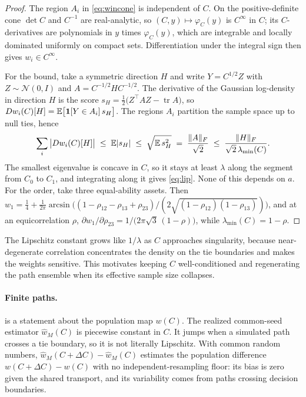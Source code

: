 \begin{proof}
The region $A_i$ in \eqref{eq:wincone} is independent of $C$. On the
positive-definite cone $\det C$ and $C^{-1}$ are real-analytic, so
$(C, y) \mapsto \varphi_C(y)$ is $C^\infty$ in $C$; its $C$-derivatives are
polynomials in $y$ times $\varphi_C(y)$, which are integrable and locally
dominated uniformly on compact sets. Differentiation under the integral sign
then gives $w_i \in C^\infty$.

For the bound, take a symmetric direction $H$ and write $Y = C^{1/2}Z$ with
$Z\sim\mathcal N(0,I)$ and $A = C^{-1/2}HC^{-1/2}$. The derivative of the
Gaussian log-density in direction $H$ is the score
$s_H = \tfrac12\big(Z^\top A Z - \operatorname{tr}A\big)$, so
$Dw_i(C)[H] = \mathbb{E}\big[\mathbf 1[Y\in A_i]\,s_H\big]$. The regions $A_i$ partition
the sample space up to null ties, hence
\[
  \sum_i \big|Dw_i(C)[H]\big| \;\le\; \mathbb{E}|s_H| \;\le\; \sqrt{\mathbb{E}\, s_H^2}
  \;=\; \frac{\|A\|_F}{\sqrt2} \;\le\; \frac{\|H\|_F}{\sqrt2\,\lambda_{\min}(C)} .
\]
The smallest eigenvalue is concave in $C$, so it stays at least $\lambda$ along
the segment from $C_0$ to $C_1$, and integrating along it gives \eqref{eq:lip}.
None of this depends on $a$. For the order, take three equal-ability assets. Then
$w_1 = \tfrac14 + \tfrac1{2\pi}\arcsin\!\big((1-\rho_{12}-\rho_{13}+\rho_{23})
/(2\sqrt{(1-\rho_{12})(1-\rho_{13})})\big)$, and at an equicorrelation $\rho$,
$\partial w_1/\partial\rho_{23} = 1/\big(2\pi\sqrt3\,(1-\rho)\big)$, while
$\lambda_{\min}(C) = 1-\rho$.
\end{proof}

The Lipschitz constant grows like $1/\lambda$ as $C$ approaches singularity,
because near-degenerate correlation concentrates the density on the tie
boundaries and makes the weights sensitive. This motivates keeping $C$
well-conditioned and regenerating the path ensemble when its effective sample
size collapses.

\paragraph{Finite paths.}
 is a statement about the population map $w(C)$.
The realized
common-seed estimator $\widehat w_M(C)$ is piecewise constant in $C$.
It jumps when
a simulated path crosses a tie boundary, so it is not literally Lipschitz.
With
common random numbers, $\widehat w_M(C+\Delta C) - \widehat w_M(C)$ estimates the
population difference $w(C+\Delta C) - w(C)$ with no independent-resampling floor:
its bias is zero given the shared transport, and its variability comes from paths
crossing decision boundaries.


